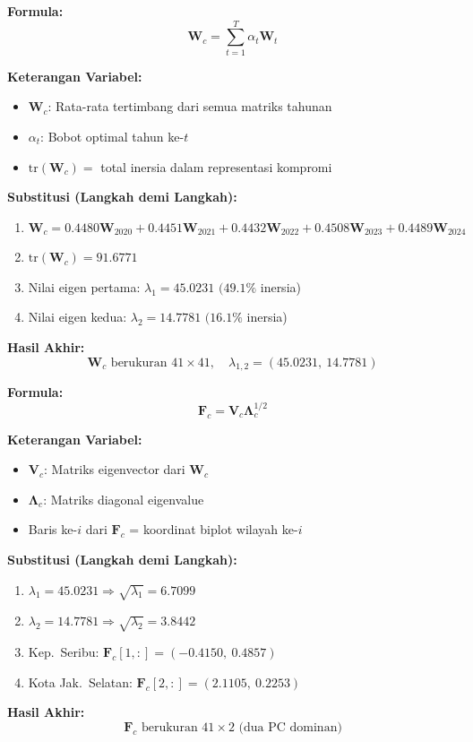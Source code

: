 \documentclass[11pt,a4paper]{article}
\begin{document}
\begin{tcolorbox}[formula_box, title={16. Matriks Kompromi ($\mathbf{W}_c$)}]
\textbf{Formula:}
\[ \mathbf{W}_c = \sum_{t=1}^{T} \alpha_t \mathbf{W}_t \]

\textbf{Keterangan Variabel:}
\begin{itemize}
  \item $\mathbf{W}_c$: Rata-rata tertimbang dari semua matriks tahunan
  \item $\alpha_t$: Bobot optimal tahun ke-$t$
  \item $\text{tr}(\mathbf{W}_c) = $ total inersia dalam representasi kompromi
\end{itemize}

\textbf{Substitusi (Langkah demi Langkah):}
\begin{enumerate}
  \item $\mathbf{W}_c = 0.4480\mathbf{W}_{2020} + 0.4451\mathbf{W}_{2021} + 0.4432\mathbf{W}_{2022} + 0.4508\mathbf{W}_{2023} + 0.4489\mathbf{W}_{2024}$
  \item $\text{tr}(\mathbf{W}_c) = 91.6771$
  \item Nilai eigen pertama: $\lambda_1 = 45.0231$ $(49.1\%$ inersia)
  \item Nilai eigen kedua: $\lambda_2 = 14.7781$ $(16.1\%$ inersia)
\end{enumerate}

\textbf{Hasil Akhir:}
\[ \mathbf{W}_c \text{ berukuran } 41\times41, \quad \lambda_{1,2} = (45.0231,\ 14.7781) \]
\end{tcolorbox}

\begin{tcolorbox}[formula_box, title={17. Koordinat Skor Kompromi ($\mathbf{F}_c$)}]
\textbf{Formula:}
\[ \mathbf{F}_c = \mathbf{V}_c \mathbf{\Lambda}_c^{1/2} \]

\textbf{Keterangan Variabel:}
\begin{itemize}
  \item $\mathbf{V}_c$: Matriks eigenvector dari $\mathbf{W}_c$
  \item $\mathbf{\Lambda}_c$: Matriks diagonal eigenvalue
  \item Baris ke-$i$ dari $\mathbf{F}_c$ = koordinat biplot wilayah ke-$i$
\end{itemize}

\textbf{Substitusi (Langkah demi Langkah):}
\begin{enumerate}
  \item $\lambda_1 = 45.0231 \Rightarrow \sqrt{\lambda_1} = 6.7099$
  \item $\lambda_2 = 14.7781 \Rightarrow \sqrt{\lambda_2} = 3.8442$
  \item Kep.\ Seribu: $\mathbf{F}_c[1,:] = (-0.4150,\ 0.4857)$
  \item Kota Jak.\ Selatan: $\mathbf{F}_c[2,:] = (2.1105,\ 0.2253)$
\end{enumerate}

\textbf{Hasil Akhir:}
\[ \mathbf{F}_c \text{ berukuran } 41\times2 \text{ (dua PC dominan)} \]
\end{tcolorbox}
\end{document}
